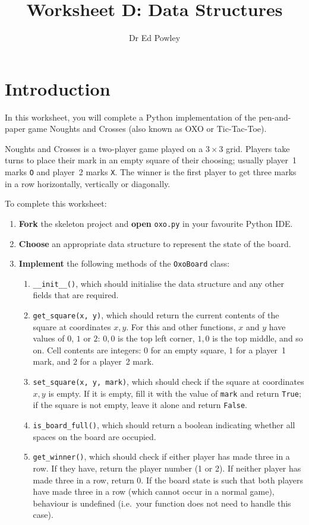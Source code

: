 \documentclass{../../fal_assignment}
\title{Worksheet D: Data Structures}
\author{Dr Ed Powley}
\begin{document}
\maketitle
{}

\section*{Introduction}

In this worksheet, you will complete a Python implementation of the pen-and-paper game Noughts and Crosses
(also known as OXO or Tic-Tac-Toe).

Noughts and Crosses is a two-player game played on a $3 \times 3$ grid.
Players take turns to place their mark in an empty square of their choosing; usually
player~1 marks \texttt{O} and player~2 marks \texttt{X}.
The winner is the first player to get three marks in a row horizontally, vertically or diagonally.

To complete this worksheet:

\begin{enumerate}[label=(\alph*)]
	\item \textbf{Fork} the skeleton project and \textbf{open} \texttt{oxo.py} in your favourite Python IDE.
	\item \textbf{Choose} an appropriate data structure to represent the state of the board.
	\item \textbf{Implement} the following methods of the \lstinline{OxoBoard} class:
		\begin{enumerate}[label=(\roman*)]
			\item \lstinline{__init__()}, which should initialise the data structure and any other fields that are required.
			\item \lstinline{get_square(x, y)}, which should return the current contents of the square at coordinates $x,y$.
				For this and other functions, $x$ and $y$ have values of $0$, $1$ or $2$:
				$0,0$ is the top left corner, $1,0$ is the top middle, and so on.
				Cell contents are integers: $0$ for an empty square,
				$1$ for a player~1 mark, and $2$ for a player~2 mark.
			\item \lstinline{set_square(x, y, mark)}, which should check if the square at coordinates $x,y$ is empty.
				If it is empty, fill it with the value of \lstinline{mark} and return \lstinline{True};
				if the square is not empty, leave it alone and return \lstinline{False}.
			\item \lstinline{is_board_full()}, which should return a boolean indicating whether all spaces on the board are occupied.
			\item \lstinline{get_winner()}, which should check if either player has made three in a row.
				If they have, return the player number (1 or 2).
				If neither player has made three in a row, return 0.
				If the board state is such that both players have made three in a row (which cannot occur in a normal game),
				behaviour is undefined (i.e.\ your function does not need to handle this case).
		\end{enumerate}
\end{enumerate}
\end{document}
